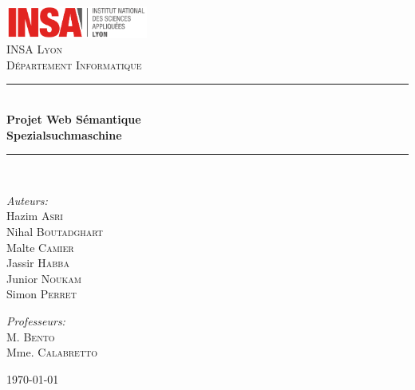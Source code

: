 \documentclass[a4paper]{article}
\begin{document}
\newcommand{\HRule}{\rule{\linewidth}{0.5mm}}


\begin{center}
\includegraphics[width=0.35\textwidth]{./logo}~\\[2cm]
\vspace{3cm}
\textsc{\LARGE INSA Lyon}\\[0.5cm]
\textsc{\Large Département Informatique}\\[0.5cm]
\HRule \\[0.4cm]
{\huge \bfseries Projet Web Sémantique\\
Spezialsuchmaschine\\[0.4cm] }
\HRule \\[1.5cm]
\begin{minipage}{0.4\textwidth}
\begin{flushleft} \large
\emph{Auteurs:} \\
Hazim \textsc{Asri}\\
Nihal \textsc{Boutadghart}\\
Malte \textsc{Camier}\\
Jassir \textsc{Habba}\\
Junior \textsc{Noukam}\\
Simon \textsc{Perret}\\
\end{flushleft}
\end{minipage}
\begin{minipage}{0.4\textwidth}
\begin{flushright} \large
\emph{Professeurs:} \\
M. \textsc{Bento}\\
Mme. \textsc{Calabretto}\\
\end{flushright}
\end{minipage}
\vfill
{\large \today}
    
\end{center}


\newpage
~
\thispagestyle{empty}

\tableofcontents
\thispagestyle{empty}
\setcounter{page}{0}
\end{document}

